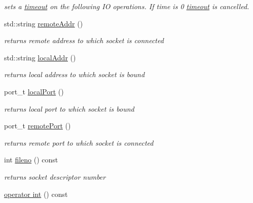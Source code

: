 \begin{CompactItemize}
\begin{CompactList}\small\item\em sets a \hyperlink{classsocketpp_1_1timeout}{timeout} on the following IO operations. If time is 0 \hyperlink{classsocketpp_1_1timeout}{timeout} is cancelled. \item\end{CompactList}\item 
std::string \hyperlink{classsocketpp_1_1BaseSocket_483c6186ae60d0c399983e14f55af600}{remoteAddr} ()
\begin{CompactList}\small\item\em returns remote address to which socket is connected \item\end{CompactList}\item 
std::string \hyperlink{classsocketpp_1_1BaseSocket_0caed2e7d3f0e4db7d4c1aa3aba52caf}{localAddr} ()
\begin{CompactList}\small\item\em returns local address to which socket is bound \item\end{CompactList}\item 
port\_\-t \hyperlink{classsocketpp_1_1BaseSocket_d4a2c0e4932436ef61f911514385d16c}{localPort} ()
\begin{CompactList}\small\item\em returns local port to which socket is bound \item\end{CompactList}\item 
port\_\-t \hyperlink{classsocketpp_1_1BaseSocket_039db642444d2111f2f58ebe032c5f5f}{remotePort} ()
\begin{CompactList}\small\item\em returns remote port to which socket is connected \item\end{CompactList}\item 
int \hyperlink{classsocketpp_1_1BaseSocket_c96db07cc917926d895d89cf73734ea1}{fileno} () const 
\begin{CompactList}\small\item\em returns socket descriptor number \item\end{CompactList}\item 
\hypertarget{classsocketpp_1_1BaseSocket_fa397f810462fe61238dbbf2d9c42c90}{
\hyperlink{classsocketpp_1_1BaseSocket_fa397f810462fe61238dbbf2d9c42c90}{operator int} () const }
\label{classsocketpp_1_1BaseSocket_fa397f810462fe61238dbbf2d9c42c90}


\end{CompactItemize}

